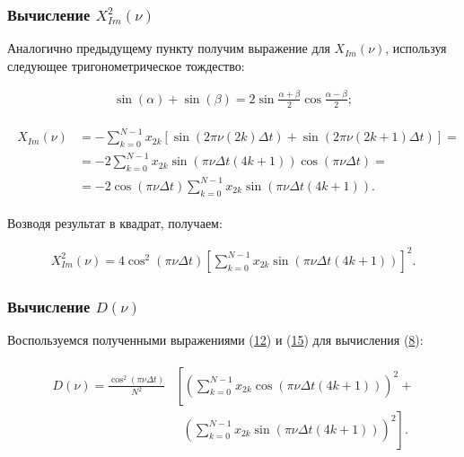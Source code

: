 \documentclass[12pt]{article}
\newcommand{\hl}[1]{(\hyperlink{eq:#1}{#1})}
\newcommand{\s}[2]{\hypertarget{skip:#1}{\vspace{#2pt}}}
\newcommand{\sd}[1]{\hypertarget{skip:#1}{\vspace{-10pt}}}
\newcommand{\hep}[2]{\vspace{#2pt}\hypertarget{eq:#1}{}\vspace{-#2pt}}
\newcommand{\hs}[1]{\sd{#1}\hep{#1}{18}}
\begin{document}
\subsubsection{Вычисление $ X_{Im}^2(\nu) $}

Аналогично предыдущему пункту получим выражение для $ X_{Im}(\nu) $, используя следующее тригонометрическое тождество:

\sd{13}
\begin{gather}
    \sin(\alpha) + \sin(\beta) = 2 \sin \frac{\alpha + \beta}{2} \cos \frac{\alpha - \beta}{2};
\end{gather}

\s{14}{-20}
\begin{gather}
    \begin{split}
    X_{Im}(\nu) &= - \sum_{k = 0}^{N - 1} x_{2 k} [ \sin(2 \pi \nu (2 k) \Delta t) + \sin(2 \pi \nu (2 k + 1) \Delta t) ] = \\
    &= - 2 \sum_{k = 0}^{N - 1} x_{2 k} \sin(\pi \nu \Delta t (4k + 1)) \cos(\pi \nu \Delta t) = \\
    &= - 2 \cos(\pi \nu \Delta t) \sum_{k = 0}^{N - 1} x_{2 k} \sin(\pi \nu \Delta t (4k + 1)).
    \end{split}
\end{gather}

Возводя результат в квадрат, получаем:

\hs{15}
\begin{gather}
    X_{Im}^2(\nu) = 4 \cos^2(\pi \nu \Delta t) \left[ \sum_{k = 0}^{N - 1} x_{2 k} \sin(\pi \nu \Delta t (4 k + 1) ) \right]^2.
\end{gather}

\subsubsection{Вычисление $ D(\nu) $}

Воспользуемся полученными выражениями \hl{12} и \hl{15} для вычисления \hl{8}:

\hs{16}
\begin{gather}
\begin{split}
    D(\nu) = \frac{\cos^2(\pi \nu \Delta t)}{N^2} & \left[ \left( \sum_{k = 0}^{N - 1} x_{2 k} \cos(\pi \nu \Delta t (4 k + 1)) \right)^2 + \right. \\
    & \hspace{7pt} \left. \left( \sum_{k = 0}^{N - 1} x_{2 k} \sin(\pi \nu \Delta t (4 k + 1)) \right)^2\right].
\end{split}
\end{gather}
\end{document}
